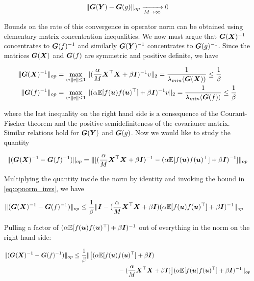 \begin{equation}
    \|  \boldsymbol{G}(\boldsymbol{Y}) - \boldsymbol{G}(g)\|_{op} \xrightarrow[M\rightarrow \infty]{} 0
\end{equation}

Bounds on the rate of this convergence in operator norm can be obtained using elementary matrix concentration inequalities. 
We now must argue that $\boldsymbol{G}(\boldsymbol{X})^{-1}$ concentrates to $\boldsymbol{G}(f)^{-1}$ and similarly $\boldsymbol{G}(\boldsymbol{Y})^{-1}$ concentrates to $\boldsymbol{G}(g)^{-1}$.  
Since the matrices $\boldsymbol{G}(\boldsymbol{X})$ and $\boldsymbol{G}(f)$ are symmetric and positive definite, 
we have 

\begin{align}\label{eq:opnorm_invs}
    \| \boldsymbol{G}(\boldsymbol{X})^{-1} \|_{op} &=  \max_{v: \|v \| \le 1} \| (\frac{\alpha}{M} \boldsymbol{X}^\top \boldsymbol{X} + \beta \boldsymbol{I})^{-1} v \|_2 = \frac{1}{\lambda_{min}(\boldsymbol{G}(\boldsymbol{X})) } \le \frac{1}{\beta} \\
    \| \boldsymbol{G}(f)^{-1} \|_{op} &=  \max_{v: \|v \| \le 1} \| (\alpha \mathbb{E}[f(\boldsymbol{u}) f(\boldsymbol{u})^\top] + \beta \boldsymbol{I})^{-1} v \|_2 = \frac{1}{\lambda_{min}(\boldsymbol{G}(f)) } \le \frac{1}{\beta} 
\end{align}

where the last inequality on the right hand side is a consequence of the Courant-Fischer theorem and the positive-semidefiniteness of the covariance matrix. 
Similar relations hold for $\boldsymbol{G}(\boldsymbol{Y})$ and $\boldsymbol{G}(g)$.
Now we would like to study the quantity

\begin{equation}
    \|  (\boldsymbol{G}(\boldsymbol{X})^{-1} - \boldsymbol{G}(f)^{-1})\|_{op} = \|[(\frac{\alpha}{M} \boldsymbol{X}^\top \boldsymbol{X} + \beta \boldsymbol{I})^{-1} - (\alpha \mathbb{E}[f(\boldsymbol{u}) f(\boldsymbol{u})^\top] + \beta \boldsymbol{I})^{-1} ]  \|_{op} 
\end{equation}

Multiplying the quantity inside the norm by identity and invoking the bound in \cref{eq:opnorm_invs}, we have

\begin{align}
     \|  (\boldsymbol{G}(\boldsymbol{X})^{-1} - \boldsymbol{G}(f)^{-1})\|_{op} &\le \frac{1}{\beta} \| \boldsymbol{I} - (\frac{\alpha}{M} \boldsymbol{X}^\top \boldsymbol{X} + \beta \boldsymbol{I}) (\alpha \mathbb{E}[f(\boldsymbol{u}) f(\boldsymbol{u})^\top] + \beta \boldsymbol{I})^{-1}  \|_{op}
\end{align}

Pulling a factor of $(\alpha \mathbb{E}[f(\boldsymbol{u}) f(\boldsymbol{u})^\top] + \beta \boldsymbol{I})^{-1}$ out of everything in the norm on the right hand side:

\begin{align*}
     \|  (\boldsymbol{G}(\boldsymbol{X})^{-1} - \boldsymbol{G}(f)^{-1})\|_{op} \le \frac{1}{\beta} \| \big{[} (\alpha \mathbb{E}[f(\boldsymbol{u})& f(\boldsymbol{u})^\top] + \beta \boldsymbol{I}) \\
     & - (\frac{\alpha}{M} \boldsymbol{X}^\top \boldsymbol{X} + \beta \boldsymbol{I}) \big{]} (\alpha \mathbb{E}[f(\boldsymbol{u}) f(\boldsymbol{u})^\top] + \beta \boldsymbol{I})^{-1}  \|_{op} 
\end{align*}

